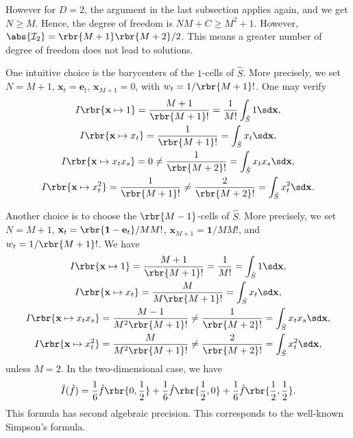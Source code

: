 \documentclass[english, nochinese]{pnote}
\begin{document}
However for $ D = 2 $, the argument in the last subsection applies again, and we get $ N \ge M $. Hence, the degree of freedom is $ N M + C \ge M^2 + 1 $. However, $ \abs{\mathcal{I}_2} = \rbr{ M + 1 } \rbr{ M + 2 } / 2 $. This means a greater number of degree of freedom does not lead to solutions.

One intuitive choice is the barycenters of the $1$-cells of $\hat{S}$. More precisely, we set $ N = M + 1 $, $ \mathbf{x}_t = \mathbf{e}_t $, $ \mathbf{x}_{ M + 1 } = 0 $, with $ w_t = 1 / \rbr{ M + 1 } ! $. One may verify
\begin{gather}
I \rbr{ \mathbf{x} \mapsto 1 } = \frac{ M + 1 }{ \rbr{ M + 1 } ! } = \frac{1}{ M ! } \int_{\hat{S}} 1 \sd \mathbf{x}, \\
I \rbr{ \mathbf{x} \mapsto x_t } = \frac{1}{ \rbr{ M + 1 } ! } = \int_{\hat{S}} x_t \sd \mathbf{x}, \\
I \rbr{ \mathbf{x} \mapsto x_t x_s } = 0 \neq \frac{1}{ \rbr{ M + 2 } ! } = \int_{\hat{S}} x_t x_s \sd \mathbf{x}, \\
I \rbr{ \mathbf{x} \mapsto x_t^2 } = \frac{1}{ \rbr{ M + 1 } ! } \neq \frac{2}{ \rbr{ M + 2 } ! } = \int_{\hat{S}} x_t^2 \sd \mathbf{x}.
\end{gather}

Another choice is to choose the $ \rbr{ M - 1 } $-cells of $\hat{S}$. More precisely, we set $ N = M + 1 $, $ \mathbf{x}_t = \rbr{ \mathbf{1} - \mathbf{e}_t } / M M ! $, $ \mathbf{x}_{ M + 1 } = \mathbf{1} / M M ! $, and $ w_t = 1 / \rbr{ M + 1 } ! $. We have
\begin{gather}
I \rbr{ \mathbf{x} \mapsto 1 } = \frac{ M + 1 }{ \rbr{ M + 1 } ! } = \frac{1}{ M ! } = \int_{\hat{S}} 1 \sd \mathbf{x}, \\
I \rbr{ \mathbf{x} \mapsto x_t } = \frac{M}{ M \rbr{ M + 1 } ! } = \int_{\hat{S}} x_t \sd \mathbf{x}, \\
I \rbr{ \mathbf{x} \mapsto x_t x_s } = \frac{ M - 1 }{ M^2 \rbr{ M + 1 } ! } \neq \frac{1}{ \rbr{ M + 2 } ! } = \int_{\hat{S}} x_t x_s \sd \mathbf{x}, \\
I \rbr{ \mathbf{x} \mapsto x_t^2 } = \frac{M}{ M^2 \rbr{ M + 1 } ! } \neq \frac{2}{ \rbr{ M + 2 } ! } = \int_{\hat{S}} x_t^2 \sd \mathbf{x},
\end{gather}
unless $ M = 2 $. In the two-dimensional case, we have
\begin{equation}
\hat{I} (\hat{f}) = \frac{1}{6} \hat{f} \rbr{ 0, \frac{1}{2} } + \frac{1}{6} \hat{f} \rbr{ \frac{1}{2}, 0 } + \frac{1}{6} \hat{f} \rbr{ \frac{1}{2}, \frac{1}{2} }.
\end{equation}
This formula has second algebraic precision. This corresponds to the well-known Simpson's formula.
\end{document}
